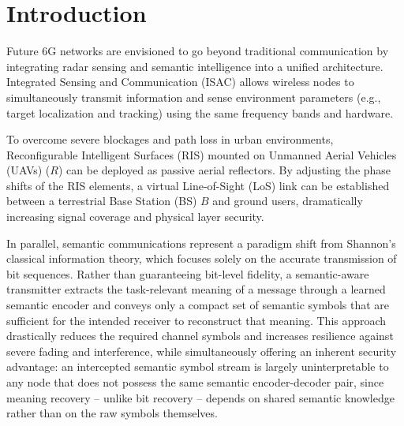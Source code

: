 \documentclass[journal,onecolumn]{IEEEtran}
\begin{document}
\IEEEpeerreviewmaketitle

\section{Introduction}
Future 6G networks are envisioned to go beyond traditional communication by integrating radar sensing and semantic intelligence into a unified architecture. Integrated Sensing and Communication (ISAC) allows wireless nodes to simultaneously transmit information and sense environment parameters (e.g., target localization and tracking) using the same frequency bands and hardware.

To overcome severe blockages and path loss in urban environments, Reconfigurable Intelligent Surfaces (RIS) mounted on Unmanned Aerial Vehicles (UAVs) ($R$) can be deployed as passive aerial reflectors. By adjusting the phase shifts of the RIS elements, a virtual Line-of-Sight (LoS) link can be established between a terrestrial Base Station (BS) $B$ and ground users, dramatically increasing signal coverage and physical layer security.

In parallel, semantic communications represent a paradigm shift from Shannon's classical information theory, which focuses solely on the accurate transmission of bit sequences. Rather than guaranteeing bit-level fidelity, a semantic-aware transmitter extracts the task-relevant meaning of a message through a learned semantic encoder and conveys only a compact set of semantic symbols that are sufficient for the intended receiver to reconstruct that meaning. This approach drastically reduces the required channel symbols and increases resilience against severe fading and interference, while simultaneously offering an inherent security advantage: an intercepted semantic symbol stream is largely uninterpretable to any node that does not possess the same semantic encoder-decoder pair, since meaning recovery -- unlike bit recovery -- depends on shared semantic knowledge rather than on the raw symbols themselves.
\end{document}

